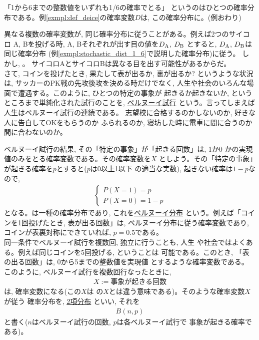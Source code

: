 \begin{exmpl}\label{exmpl:stochastic_dist_1_6} 「1から6までの整数値をいずれも1/6の確率でとる」
というのはひとつの確率分布である。例\ref{exmpl:def_deice}の確率変数$D$は, 
この確率分布に。(例おわり)\end{exmpl}
\mv

異なる複数の確率変数が, 同じ確率分布に従うことがある。例えば2つのサイコロ
A, Bを投げる時, A, Bそれぞれが出す目の値を$D_{\text A}$, $D_{\text B}$
とすると, $D_{\text A}$, $D_{\text B}$は同じ確率分布
(例\ref{exmpl:stochastic_dist_1_6}で説明した確率分布)に従う。
しかし, 。
サイコロAとサイコロBは異なる目を出す可能性があるからだ。 \\

さて, コインを投げたとき, 果たして表が出るか, 裏が出るか?
というような状況は, サッカーのPK戦の先攻後攻を決める時だけでなく, 
人生や社会のいろんな場面で遭遇する。このように, ひとつの特定の事象が
起きるか起きないか, というところまで単純化された試行のことを, 
\underline{ベルヌーイ試行}
という。言ってしまえば人生はベルヌーイ試行の連続である。
志望校に合格するのかしないのか, 好きな人に告白してOKをもらうのか
ふられるのか, 寝坊した時に電車に間に合うのか間に合わないのか。

ベルヌーイ試行の結果, その「特定の事象」が「起きる回数」は, 1か0
かの実現値のみをとる確率変数である。その確率変数を$X$
としよう。その「特定の事象」が起きる確率を$p$とすると($p$は0以上1以下
の適当な実数), 起きない確率は$1-p$なので, 
\begin{eqnarray}
\begin{cases}
P(X=1)=p\\
P(X=0)=1-p
\end{cases}\label{eq:stoch_dist_Bernoulli}
\end{eqnarray}
となる。は一種の確率分布であり, 
これを\underline{ベルヌーイ分布}
という。例えば「コインを1回投げたとき, 表が出る回数」は, 
ベルヌーイ分布に従う確率変数であり, コインが表裏対称にできていれば, 
$p=0.5$である。\\

同一条件でベルヌーイ試行を複数回, 独立に行うことも, 人生
や社会ではよくある。例えば同じコインを5回投げる, ということは
可能である。このとき, 「表の出る回数」は, 0から5までの整数値を実現値
とするような確率変数である。
このように, ベルヌーイ試行を複数回行なったときに, 
\begin{eqnarray}
X:=\text{事象が起きる回数}\label{eq:X_binomial_def}
\end{eqnarray}
は, 確率変数になる(この$X$は
の$X$とは違う意味である)。そのような確率変数$X$が従う
確率分布を, \underline{2項分布}
といい, それを
\begin{eqnarray}
B(n, p)
\end{eqnarray}
と書く($n$はベルヌーイ試行の回数, $p$は各ベルヌーイ試行で
事象が起きる確率である)。\\

